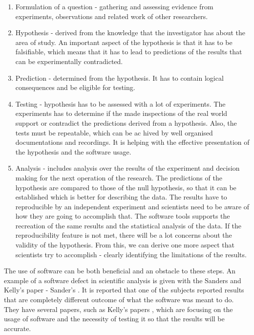 \begin{enumerate}
\item Formulation of a question - gathering and assessing evidence from experiments, observations and related work of other researchers.

\item Hypothesis - derived from the knowledge that the investigator has about the area of study. An important aspect of the hypothesis is that it has to be falsifiable, which means that it has to lead to predictions of the results that can be experimentally contradicted. 

\item Prediction - determined from the hypothesis. It has to contain logical consequences and be eligible for testing.

\item Testing - hypothesis has to be assessed with a lot of experiments. The experiments has to determine if the made inspections of the real world support or contradict the predictions derived from a hypothesis. Also, the tests must be repeatable, which can be ac hived by well organised documentations and recordings. It is helping with the effective presentation of the hypothesis and the software usage.

\item Analysis - includes analysis over the results of the experiment and decision making for the next operation of the research. The predictions of the hypothesis are compared to those of the null hypothesis, so that it can be established which is better for describing the data. The results have to reproducible by an independent experiment and scientists need to be aware of how they are going to accomplish that. The software tools supports the recreation of the same results and the statistical analysis of the data. If the reproducibility feature is not met, there will be a lot concerns about the validity of the hypothesis. From this, we can derive one more aspect that scientists try to accomplish - clearly identifying the limitations of the results.

\end{enumerate}

The use of software can be both beneficial and an obstacle to these steps. An example of a software defect in scientific analysis is given with the Sanders and Kelly's paper - Sander's \cite{sanders2008dealing}. It is reported that one of the subjects reported results that are completely different outcome of what the software was meant to do. They have several papers, such as Kelly's papers \cite{kellyassessing}\cite{kelly2009five}, which are focusing on the usage of software and the necessity of testing it so that the results will be accurate. 

